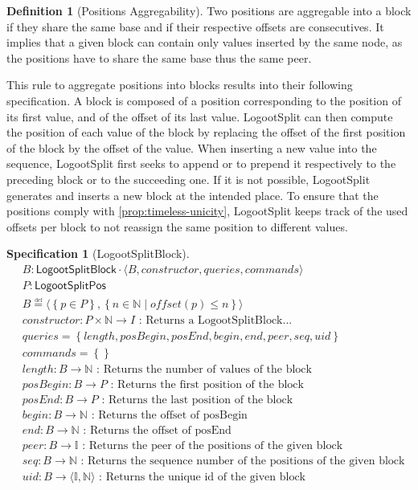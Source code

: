 \documentclass{article}
\newcommand{\commands}[1]{commands = \set{#1}}
\newcommand{\defeq}{\overset{\underset{\mathrm{def}}{}}{=}}
\newcommand{\fnspec}[3]{#1: #2 \text{ : #3}}
\newcommand{\inbb}[1]{\in \mathbb{#1}}
\newcommand{\queries}[1]{queries = \set{#1}}
\newcommand{\set}[1]{\left\{#1\right\}} %
\newcommand{\spectuple}[1]{\tuple{#1, constructor, queries, commands}}
\newcommand{\ssep}{\mid} %
\newcommand{\tuple}[1]{\langle #1 \rangle}
\theoremstyle{definition}
\newtheorem{definition}{Definition}
\newtheorem{specification}{Specification}
\begin{document}
\begin{definition}[Positions Aggregability]
    Two positions are aggregable into a block if they share the same base and if their respective offsets are consecutives.
    It implies that a given block can contain only values inserted by the same node, as the positions have to share the same base thus the same peer.
\end{definition}


This rule to aggregate positions into blocks results into their following specification.
A block is composed of a position corresponding to the position of its first value, and of the offset of its last value.
LogootSplit can then compute the position of each value of the block by replacing the offset of the first position of the block by the offset of the value.
When inserting a new value into the sequence, LogootSplit first seeks to append or to prepend it respectively to the preceding block or to the succeeding one.
If it is not possible, LogootSplit generates and inserts a new block at the intended place.
To ensure that the positions comply with \autoref{prop:timeless-unicity}, LogootSplit keeps track of the used offsets per block to not reassign the same position to different values.

\begin{specification}[LogootSplitBlock]
    \begin{align*}
    &B: \mathsf{LogootSplitBlock} \cdot \spectuple{B}\\
    &P: \mathsf{LogootSplitPos}\\
    &B \defeq \tuple{\set{p \in P}, \set{n \inbb{N} \ssep offset(p) \leq n}}\\
    &\fnspec{constructor}{P \times \mathbb{N} \to I}{Returns a LogootSplitBlock...}\\
    &\queries{length, posBegin, posEnd, begin, end, peer, seq, uid}\\
    &\commands{}\\
    &\fnspec{length}{B \to \mathbb{N}}{Returns the number of values of the block}\\
    &\fnspec{posBegin}{B \to P}{Returns the first position of the block}\\
    &\fnspec{posEnd}{B \to P}{Returns the last position of the block}\\
    &\fnspec{begin}{B \to \mathbb{N}}{Returns the offset of posBegin}\\
    &\fnspec{end}{B \to \mathbb{N}}{Returns the offset of posEnd}\\
    &\fnspec{peer}{B \to \mathbb{I}}{Returns the peer of the positions of the given block}\\
    &\fnspec{seq}{B \to \mathbb{N}}{Returns the sequence number of the positions of the given block}\\
    &\fnspec{uid}{B \to \tuple{\mathbb{I}, \mathbb{N}}}{Returns the unique id of the given block}
    \end{align*}
    \label{spec:logootsplit-block}
\end{specification}
\end{document}

